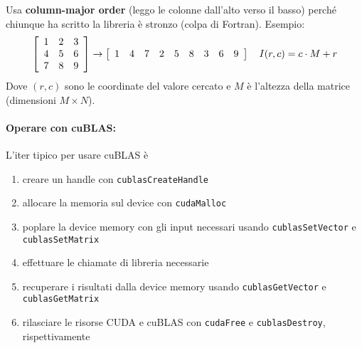 Usa \textbf{column-major order} (leggo le colonne dall'alto verso il basso) perché chiunque ha scritto la libreria è stronzo (colpa di Fortran). Esempio: 
$$
\left[
\begin{array}{c c c}
	1 & 2 & 3 \\
	4 & 5 & 6 \\
	7 & 8 & 9
\end{array}
\right]
\rightarrow \left[\begin{array}{c c c c c c c c c}
	1 & 4 & 7 & 2 & 5 & 8 & 3 & 6  & 9
\end{array}\right]
\quad I(r,c) = c \cdot M  + r 
$$
Dove $(r,c)$ sono le coordinate del valore cercato e $M$ è l'altezza della matrice (dimensioni $M \times N$).\\

\paragraph{Operare con cuBLAS:} L'iter tipico per usare cuBLAS è 
\begin{enumerate}
	\item creare un handle con \texttt{cublasCreateHandle}
	\item allocare la memoria sul device con \texttt{cudaMalloc}
	\item poplare la device memory con gli input necessari usando \texttt{cublasSetVector} e \texttt{cublasSetMatrix}
	\item effettuare le chiamate di libreria necessarie
	\item recuperare i risultati dalla device memory usando \texttt{cublasGetVector} e \texttt{cublasGetMatrix}
	\item rilasciare le risorse CUDA e cuBLAS con \texttt{cudaFree} e \texttt{cublasDestroy}, rispettivamente
\end{enumerate}


